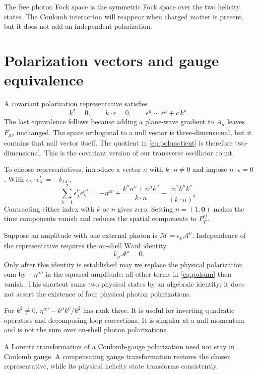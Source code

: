 \documentclass[11pt]{article}
\newcommand{\module}[1]{\clearpage\section{#1}}
\newcommand{\cM}{\mathcal M}
\begin{document}
\begin{keyidea}
The free photon Fock space is the symmetric Fock space over the two
helicity states. The Coulomb interaction will reappear when charged
matter is present, but it does not add an independent polarization.
\end{keyidea}

\module{Polarization vectors and gauge equivalence}
A covariant polarization representative satisfies
\begin{equation}
 k^2=0,\qquad k\cdot\epsilon=0,\qquad
 \epsilon^\mu\sim\epsilon^\mu+c\,k^\mu.
 \label{eq:polquotient}
\end{equation}
The last equivalence follows because adding a plane-wave gradient to
\(A_\mu\) leaves \(F_{\mu\nu}\) unchanged. The space orthogonal to a null
vector is three-dimensional, but it contains that null vector itself.
The quotient in \eqref{eq:polquotient} is therefore two-dimensional.
This is the covariant version of our transverse oscillator count.

To choose representatives, introduce a vector \(n\) with \(k\cdot n\ne0\)
and impose \(n\cdot\epsilon=0\). With
\(\epsilon_\lambda\cdot\epsilon_{\lambda'}^*=-\delta_{\lambda\lambda'}\),
\begin{equation}
 \sum_{\lambda=1}^2\epsilon_\lambda^\mu\epsilon_\lambda^{\nu*}
 =-\eta^{\mu\nu}
 +\frac{k^\mu n^\nu+n^\mu k^\nu}{k\cdot n}
 -\frac{n^2 k^\mu k^\nu}{(k\cdot n)^2}.
 \label{eq:polsum}
\end{equation}
Contracting either index with \(k\) or \(n\) gives zero. Setting
\(n=(1,\bm0)\) makes the time components vanish and reduces the spatial
components to \(P_T^{ij}\).

Suppose an amplitude with one external photon is
\(\cM=\epsilon_\mu\mathcal A^\mu\). Independence of the representative
requires the on-shell Ward identity
\begin{equation}
 k_\mu\mathcal A^\mu=0.
\end{equation}
Only after this identity is established may we replace the physical
polarization sum by \(-\eta^{\mu\nu}\) in the squared amplitude:
all other terms in \eqref{eq:polsum} then vanish. This shortcut sums two
physical states by an algebraic identity; it does not assert the existence
of four physical photon polarizations.

\begin{remarkbox}
For \(k^2\ne0\), \(\eta^{\mu\nu}-k^\mu k^\nu/k^2\) has rank three.
It is useful for inverting quadratic operators and decomposing loop
corrections. It is singular at a null momentum and is not the sum over
on-shell photon polarizations.
\end{remarkbox}
A Lorentz transformation of a Coulomb-gauge polarization need not stay in
Coulomb gauge. A compensating gauge transformation restores the chosen
representative, while its physical helicity state transforms consistently.
\end{document}
